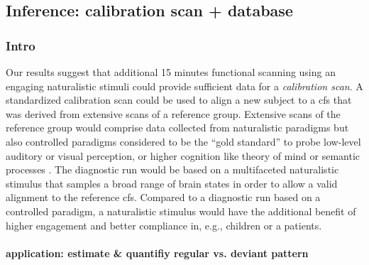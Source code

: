 \subsection{Inference: calibration scan + database}







\subsubsection{Intro}



%
Our results suggest that additional 15 minutes functional scanning using an
engaging naturalistic stimuli could provide sufficient data for a
\textit{calibration scan}.
%
A standardized calibration scan could be used to align a new subject to a
\ac{cfs} that was derived from extensive scans of a reference group.
%
Extensive scans of the reference group would comprise data collected from
naturalistic paradigms but also controlled paradigms considered to be the ``gold
standard'' to probe low-level auditory or visual perception, or higher cognition
like theory of mind \citep{spunt2014validating} or semantic processes
\citep{fedorenko2010new, fernandez2001language}.
%
The diagnostic run would be based on a multifaceted naturalistic stimulus that
samples a broad range of brain states in order to allow a valid alignment to the
reference \ac{cfs}.
%
Compared to a diagnostic run based on a controlled paradigm, a naturalistic
stimulus would have the additional benefit of higher engagement and better
compliance \citep{vanderwal2015inscapes, eickhoff2020towards} in, e.g., children
or a patients.

\paragraph{application: estimate \& quantifiy regular vs. deviant pattern}

